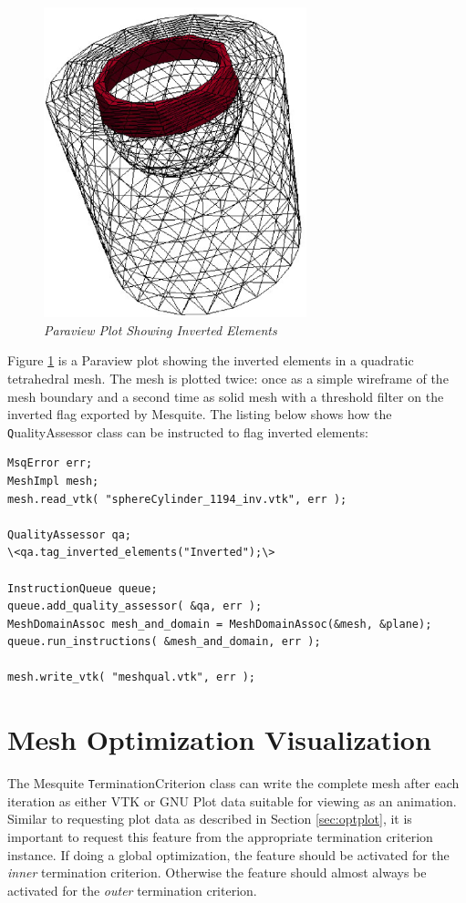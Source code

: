 \begin{figure}[htb!]
\begin{center}
\includegraphics[width=3in]{meshqual3d}
\caption{\em Paraview Plot Showing Inverted Elements \label{fig:meshqual3d}}
\end{center}
\end{figure}

Figure \ref{fig:meshqual3d} is a Paraview plot showing the inverted elements in a quadratic tetrahedral mesh.  The mesh is plotted twice: once as a simple wireframe of the mesh boundary and a second time as solid mesh with a threshold filter on the inverted flag exported by Mesquite.  The listing below shows how the {\texttt QualityAssessor} class can be instructed to flag inverted elements:

\newpage
\begin{lstlisting}[frame=single]
MsqError err;
MeshImpl mesh;
mesh.read_vtk( "sphereCylinder_1194_inv.vtk", err );

QualityAssessor qa;
\<qa.tag_inverted_elements("Inverted");\>

InstructionQueue queue;
queue.add_quality_assessor( &qa, err );
MeshDomainAssoc mesh_and_domain = MeshDomainAssoc(&mesh, &plane);
queue.run_instructions( &mesh_and_domain, err );

mesh.write_vtk( "meshqual.vtk", err );
\end{lstlisting}


\section{Mesh Optimization Visualization}

The Mesquite {\texttt TerminationCriterion} class can write the complete mesh after each iteration as either VTK or GNU Plot data suitable for viewing as an animation.	 Similar to requesting plot data as described in Section \ref {sec:optplot}, it is important to request this feature from the appropriate termination criterion instance.  If doing a global optimization, the feature should be activated for the {\em inner} termination criterion.  Otherwise the feature should almost always be activated for the {\em outer} termination criterion.

